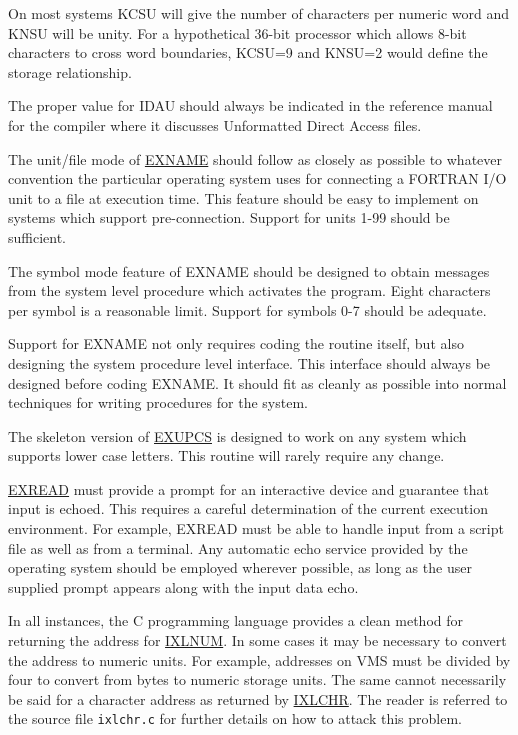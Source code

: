 On most systems KCSU will give the number of characters per numeric word and
KNSU will be unity.  For a hypothetical 36-bit processor which allows 8-bit
characters to cross word boundaries, KCSU=9 and KNSU=2 would define the
storage relationship.

The proper value for IDAU should always be indicated in the reference manual
for the compiler where it discusses Unformatted Direct Access files.

The unit/file mode of \underline{EXNAME} should follow as closely as
possible to whatever convention the particular operating system uses for
connecting a FORTRAN I/O unit to a file at execution time.  This feature
should be easy to implement on systems which support pre-connection.  Support
for units 1-99 should be sufficient.

The symbol mode feature of EXNAME should be designed to obtain messages from
the system level procedure which activates the program.  Eight characters
per symbol is a reasonable limit.  Support for symbols 0-7 should be
adequate.

Support for EXNAME not only requires coding the routine itself, but also
designing the system procedure level interface.  This interface should
always be designed before coding EXNAME.  It should fit as cleanly as
possible into normal techniques for writing procedures for the system.

The skeleton version of \underline{EXUPCS} is designed to work on any system
which supports lower case letters.  This routine will rarely require any
change.

\underline{EXREAD} must provide a prompt for an interactive device and
guarantee that input is echoed.  This requires a careful determination of
the current execution environment.  For example, EXREAD must be able to
handle input from a script file as well as from a terminal.  Any automatic
echo service provided by the operating system should be employed wherever
possible, as long as the user supplied prompt appears along with the input
data echo.

In all instances,
the C programming language provides a clean method for returning the
address for \underline{IXLNUM}\@. In some cases it may be necessary to
convert the address to numeric units.  For example, addresses on VMS must be
divided by four to convert from bytes to numeric storage units.
The same cannot necessarily be said for a character address
as returned by \underline{IXLCHR}\@.
The reader is referred to the source file \verb+ixlchr.c+ for further details
on how to attack this problem.

